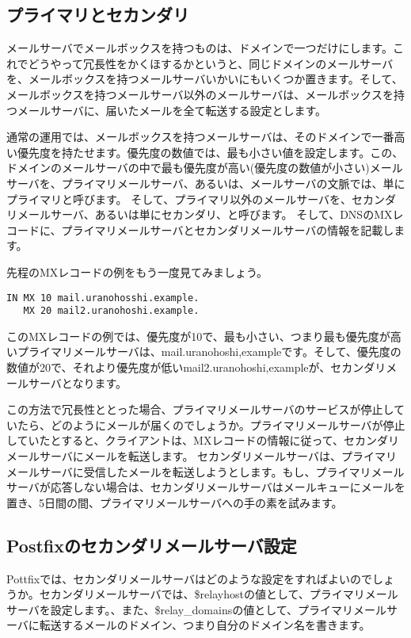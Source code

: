 \subsection{プライマリとセカンダリ}

メールサーバでメールボックスを持つものは、ドメインで一つだけにします。これでどうやって冗長性をかくほするかというと、同じドメインのメールサーバを、メールボックスを持つメールサーバいかいにもいくつか置きます。そして、メールボックスを持つメールサーバ以外のメールサーバは、メールボックスを持つメールサーバに、届いたメールを全て転送する設定とします。

通常の運用では、メールボックスを持つメールサーバは、そのドメインで一番高い優先度を持たせます。優先度の数値では、最も小さい値を設定します。この、ドメインのメールサーバの中で最も優先度が高い(優先度の数値が小さい)メールサーバを、プライマリメールサーバ、あるいは、メールサーバの文脈では、単にプライマリと呼びます。
そして、プライマリ以外のメールサーバを、セカンダリメールサーバ、あるいは単にセカンダリ、と呼びます。
そして、DNSのMXレコードに、プライマリメールサーバとセカンダリメールサーバの情報を記載します。

先程のMXレコードの例をもう一度見てみましょう。

\begin{verbatim}
IN MX 10 mail.uranohosshi.example.
   MX 20 mail2.uranohoshi.example.
\end{verbatim}

このMXレコードの例では、優先度が10で、最も小さい、つまり最も優先度が高いプライマリメールサーバは、mail.uranohoshi,exampleです。そして、優先度の数値が20で、それより優先度が低いmail2.uranohoshi,exampleが、セカンダリメールサーバとなります。

この方法で冗長性ととった場合、プライマリメールサーバのサービスが停止していたら、どのようにメールが届くのでしょうか。プライマリメールサーバが停止していたとすると、クライアントは、MXレコードの情報に従って、セカンダリメールサーバにメールを転送します。
セカンダリメールサーバは、プライマリメールサーバに受信したメールを転送しようとします。もし、プライマリメールサーバが応答しない場合は、セカンダリメールサーバはメールキューにメールを置き、5日間の間、プライマリメールサーバへの手の素を試みます。

\subsection{Postfixのセカンダリメールサーバ設定}
Pottfixでは、セカンダリメールサーバはどのような設定をすればよいのでしょうか。セカンダリメールサーバでは、\$relayhostの値として、プライマリメールサーバを設定します。、また、\$relay\_domainsの値として、プライマリメールサーバに転送するメールのドメイン、つまり自分のドメイン名を書きます。

